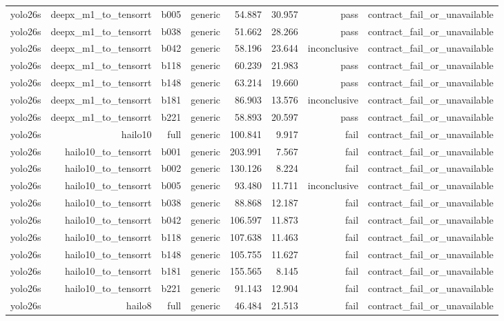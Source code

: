 \begin{table}[t]
\begin{tabular}{lrrrrrrr}
yolo26s & deepx\_m1\_to\_tensorrt & b005 & generic & 54.887 & 30.957 & pass & contract\_fail\_or\_unavailable \\
yolo26s & deepx\_m1\_to\_tensorrt & b038 & generic & 51.662 & 28.266 & pass & contract\_fail\_or\_unavailable \\
yolo26s & deepx\_m1\_to\_tensorrt & b042 & generic & 58.196 & 23.644 & inconclusive & contract\_fail\_or\_unavailable \\
yolo26s & deepx\_m1\_to\_tensorrt & b118 & generic & 60.239 & 21.983 & pass & contract\_fail\_or\_unavailable \\
yolo26s & deepx\_m1\_to\_tensorrt & b148 & generic & 63.214 & 19.660 & pass & contract\_fail\_or\_unavailable \\
yolo26s & deepx\_m1\_to\_tensorrt & b181 & generic & 86.903 & 13.576 & inconclusive & contract\_fail\_or\_unavailable \\
yolo26s & deepx\_m1\_to\_tensorrt & b221 & generic & 58.893 & 20.597 & pass & contract\_fail\_or\_unavailable \\
yolo26s & hailo10 & full & generic & 100.841 & 9.917 & fail & contract\_fail\_or\_unavailable \\
yolo26s & hailo10\_to\_tensorrt & b001 & generic & 203.991 & 7.567 & fail & contract\_fail\_or\_unavailable \\
yolo26s & hailo10\_to\_tensorrt & b002 & generic & 130.126 & 8.224 & fail & contract\_fail\_or\_unavailable \\
yolo26s & hailo10\_to\_tensorrt & b005 & generic & 93.480 & 11.711 & inconclusive & contract\_fail\_or\_unavailable \\
yolo26s & hailo10\_to\_tensorrt & b038 & generic & 88.868 & 12.187 & fail & contract\_fail\_or\_unavailable \\
yolo26s & hailo10\_to\_tensorrt & b042 & generic & 106.597 & 11.873 & fail & contract\_fail\_or\_unavailable \\
yolo26s & hailo10\_to\_tensorrt & b118 & generic & 107.638 & 11.463 & fail & contract\_fail\_or\_unavailable \\
yolo26s & hailo10\_to\_tensorrt & b148 & generic & 105.755 & 11.627 & fail & contract\_fail\_or\_unavailable \\
yolo26s & hailo10\_to\_tensorrt & b181 & generic & 155.565 & 8.145 & fail & contract\_fail\_or\_unavailable \\
yolo26s & hailo10\_to\_tensorrt & b221 & generic & 91.143 & 12.904 & fail & contract\_fail\_or\_unavailable \\
yolo26s & hailo8 & full & generic & 46.484 & 21.513 & fail & contract\_fail\_or\_unavailable \\

\end{tabular}
\end{table}
